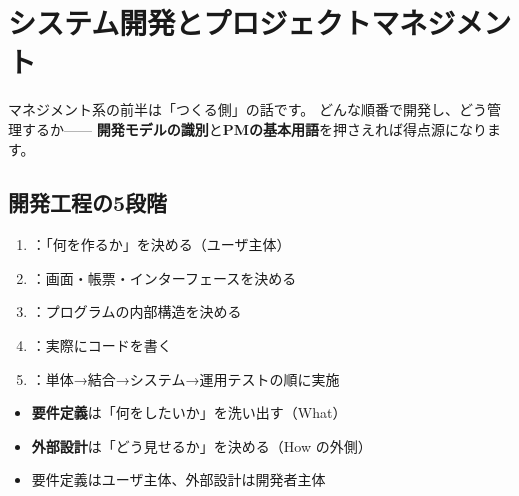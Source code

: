 \chapter{システム開発とプロジェクトマネジメント}


マネジメント系の前半は「つくる側」の話です。
どんな順番で開発し、どう管理するか——
\textbf{開発モデルの識別}と\textbf{PMの基本用語}を押さえれば得点源になります。

\section{開発工程の5段階}

\begin{teigi}
\begin{enumerate}
  \item {}：「何を作るか」を決める（ユーザ主体）
  \item {}：画面・帳票・インターフェースを決める
  \item {}：プログラムの内部構造を決める
  \item {}：実際にコードを書く
  \item {}：単体→結合→システム→運用テストの順に実施
\end{enumerate}
\end{teigi}

\begin{pitfall}[要件定義と外部設計を混同しがち]
\begin{itemize}
  \item \textbf{要件定義}は「何をしたいか」を洗い出す（What）
  \item \textbf{外部設計}は「どう見せるか」を決める（How の外側）
  \item 要件定義はユーザ主体、外部設計は開発者主体
\end{itemize}
\end{pitfall}

